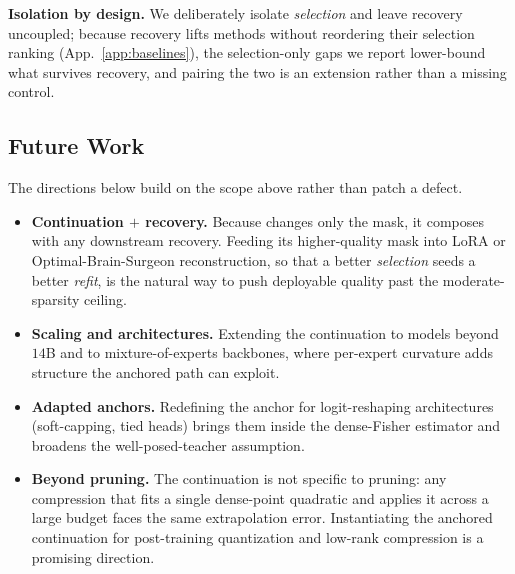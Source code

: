 \textbf{Isolation by design.} We deliberately isolate \emph{selection} and leave recovery uncoupled;
because recovery lifts methods without reordering their selection ranking (App.~\ref{app:baselines}), the
selection-only gaps we report lower-bound what survives recovery, and pairing the two is an extension rather
than a missing control.

\subsection{Future Work}
\label{app:future}
The directions below build on the scope above rather than patch a defect.
\begin{itemize}
\item \textbf{Continuation $+$ recovery.} Because \method changes only the mask, it composes with any
downstream recovery. Feeding its higher-quality mask into LoRA or Optimal-Brain-Surgeon reconstruction, so
that a better \emph{selection} seeds a better \emph{refit}, is the natural way to push deployable quality
past the moderate-sparsity ceiling.
\item \textbf{Scaling and architectures.} Extending the continuation to models beyond $14$B and to
mixture-of-experts backbones, where per-expert curvature adds structure the anchored path can exploit.
\item \textbf{Adapted anchors.} Redefining the anchor for logit-reshaping architectures (soft-capping,
tied heads) brings them inside the dense-Fisher estimator and broadens the well-posed-teacher assumption.
\item \textbf{Beyond pruning.} The continuation is not specific to pruning: any compression that fits a
single dense-point quadratic and applies it across a large budget faces the same extrapolation error.
Instantiating the anchored continuation for post-training quantization and low-rank compression is a
promising direction.
\end{itemize}

